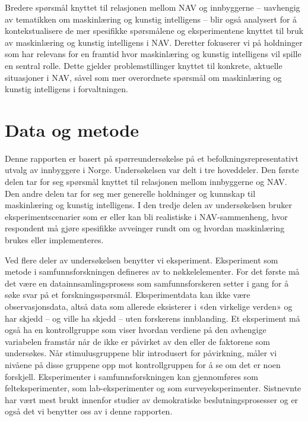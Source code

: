 \documentclass[
  12pt,
  a4paper, 12pt]{article}
\begin{document}
Bredere spørsmål knyttet til relasjonen mellom NAV og innbyggerne -- uavhengig av tematikken om maskinlæring og kunstig intelligens -- blir også analysert for å kontekstualisere de mer spesifikke spørsmålene og eksperimentene knyttet til bruk av maskinlæring og kunstig intelligens i NAV.
Deretter fokuserer vi på holdninger som har relevans for en framtid hvor maskinlæring og kunstig intelligens vil spille en sentral rolle.
Dette gjelder problemstillinger knyttet til konkrete, aktuelle situasjoner i NAV, såvel som mer overordnete spørsmål om maskinlæring og kunstig intelligens i forvaltningen.

\newpage

\hypertarget{metode}{%
\section{Data og metode}\label{metode}}

Denne rapporten er basert på spørreundersøkelse på et befolkningsrepresentativt utvalg av innbyggere i Norge.
Undersøkelsen var delt i tre hoveddeler.
Den første delen tar for seg spørsmål knyttet til relasjonen mellom innbyggerne og NAV.
Den andre delen tar for seg mer generelle holdninger og kunnskap til maskinlæring og kunstig intelligens.
I den tredje delen av undersøkelsen bruker eksperimentscenarier som er eller kan bli realistiske i NAV-sammenheng, hvor respondent må gjøre spesifikke avveinger rundt om og hvordan maskinlæring brukes eller implementeres.

Ved flere deler av undersøkelsen benytter vi eksperiment.
Eksperiment som metode i samfunnsforskningen defineres av to nøkkelelementer.
For det første må det være en datainnsamlingsprosess som samfunnsforskeren setter i gang for å søke svar på et forskningsspørsmål.
Eksperimentdata kan ikke være observasjonsdata, altså data som allerede eksisterer i «den virkelige verden» og har skjedd -- og ville ha skjedd -- uten forskerens innblanding.
Et eksperiment må også ha en kontrollgruppe som viser hvordan verdiene på den avhengige variabelen framstår når de ikke er påvirket av den eller de faktorene som undersøkes.
Når stimulusgruppene blir introdusert for påvirkning, måler vi nivåene på disse gruppene opp mot kontrollgruppen for å se om det er noen forskjell.
Eksperimenter i samfunnsforskningen kan gjennomføres som felteksperimenter, som lab-eksperimenter og som surveyeksperimenter.
Sistnevnte har vært mest brukt innenfor studier av demokratiske beslutningsprosesser og er også det vi benytter oss av i denne rapporten.
\end{document}
